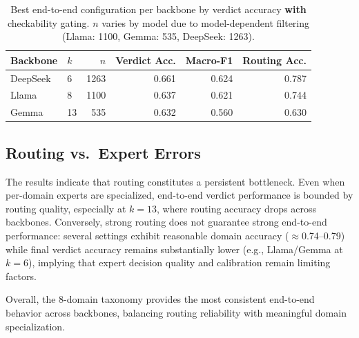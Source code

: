 \begin{table}[t]
\centering
\caption{Best end-to-end configuration per backbone by verdict accuracy \textbf{with} 
checkability gating. $n$ varies by model due to model-dependent filtering 
(Llama: 1100, Gemma: 535, DeepSeek: 1263).}
\label{tab:best_routing_gate}
\small
\begin{tabular}{llrrrr}
\toprule
Backbone & $k$ & $n$ & Verdict Acc. & Macro-F1 & Routing Acc. \\
\midrule
DeepSeek & 6  & 1263 & 0.661 & 0.624 & 0.787 \\
Llama    & 8  & 1100 & 0.637 & 0.621 & 0.744 \\
Gemma    & 13 &  535 & 0.632 & 0.560 & 0.630 \\
\bottomrule
\end{tabular}
\normalsize
\end{table}

\subsection{Routing vs.\ Expert Errors}
The results indicate that routing constitutes a persistent bottleneck. Even when per-domain experts
are specialized, end-to-end verdict performance is bounded by routing quality, especially at
$k{=}13$, where routing accuracy drops across backbones. Conversely, strong routing does not
guarantee strong end-to-end performance: several settings exhibit reasonable domain accuracy
($\approx$0.74--0.79) while final verdict accuracy remains substantially lower (e.g., Llama/Gemma
at $k{=}6$), implying that expert decision quality and calibration remain limiting factors.

Overall, the 8-domain taxonomy provides the most consistent end-to-end behavior across backbones,
balancing routing reliability with meaningful domain specialization.